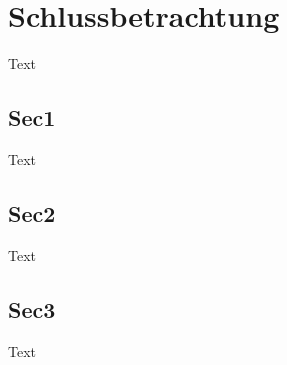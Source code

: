 \chapter{Schlussbetrachtung}

Text

\section{Sec1}

Text

\section{Sec2}

Text

\section{Sec3}

Text